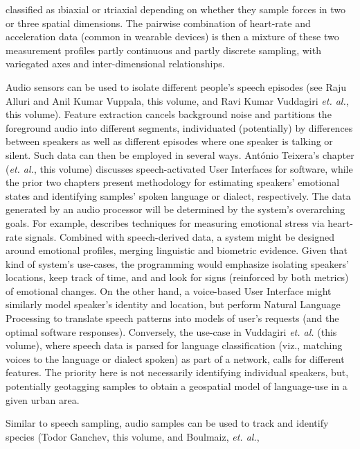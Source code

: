 {\begin{description}
classified as \i{biaxial} or \i{triaxial} depending on 
whether they sample forces in two or three spatial 
dimensions.  
The pairwise combination of heart-rate and acceleration data
(common in wearable devices) is then a mixture of these
two measurement profiles \mdash{} partly continuous and
partly discrete sampling, with variegated axes and
inter-dimensional relationships.  
\item[Speech Sampling]  Audio sensors can be used to 
isolate different people's speech episodes (see Raju Alluri 
and Anil Kumar Vuppala, this volume, and 
Ravi Kumar Vuddagiri \textit{et. al.}, this volume).  Feature 
extraction cancels background noise and partitions the foreground 
audio into different segments, individuated (potentially) by 
differences between speakers as well as different episodes 
where one speaker is talking or silent.  Such data can 
then be employed in several ways.  Ant\'onio Teixera's chapter 
(\textit{et. al.}, this volume) discusses 
speech-activated User Interfaces for 
software, while the prior two chapters present methodology for 
estimating speakers' emotional states and 
identifying samples' spoken language or dialect, 
respectively.  The data generated by 
an audio processor will be determined by the system's 
overarching goals.  For example, \cite{JongyoonChoi} describes 
techniques for measuring emotional stress via heart-rate signals.  
Combined with speech-derived data, a system might be designed 
around emotional profiles, merging linguistic and 
biometric evidence.  Given that kind of system's 
use-cases, the programming would emphasize 
isolating speakers' locations, keep track of time, and 
and look for signs (reinforced by both metrics) of 
emotional changes.  On the other hand, a voice-based 
User Interface might similarly model speaker's identity 
and location, but perform Natural Language Processing 
to translate speech patterns into models of user's 
requests (and the optimal software responses).       
Conversely, the use-case in Vuddagiri \textit{et. al.} 
(this volume), where speech data is parsed for language 
classification (viz., matching voices to the language 
or dialect spoken) as part of a  network, 
calls for different features.    
The priority here is not necessarily identifying individual 
speakers, but, potentially geotagging samples to obtain a geospatial model of 
language-use in a given urban area. 
\item[Bioacoustic Sampling]  Similar to speech sampling, 
audio samples can be used to track and identify 
species (Todor Ganchev, this volume, and Boulmaiz, \textit{et. al.}, 

\end{description}}
